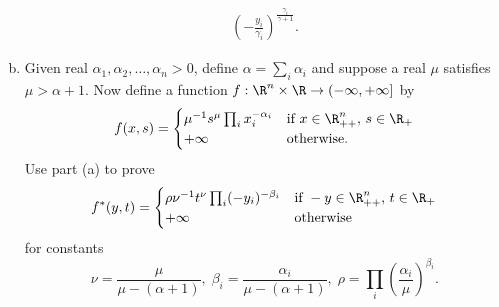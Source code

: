 \documentclass[../borwein-lewis_notes.tex]{subfiles}
\begin{document}
\begin{enumerate}[(a)]
{\begin{align*}
\left(-\frac{y_i}{\gamma_i}\right)^{\frac{\gamma_i}{\gamma+1}}.
\end{align*}
}
\item Given real $\alpha_1,\alpha_2,\ldots,\alpha_n > 0$, define $\alpha
= \sum_i\alpha_i$ and suppose a real $\mu$ satisfies $\mu>\alpha+1$. Now 
define a function $f:\R^n\times\R\to(-\infty,+\infty]$ by 
\begin{equation*}
f(x,s)=\begin{cases} \mu^{-1}s^{\mu}\prod_i x_i^{-\alpha_i}
&\text{if }x\in\R_{++}^n,\, s\in\R_+ \\
+\infty &\text{otherwise.}\end{cases}
\end{equation*}
Use part (a) to prove 
\begin{equation*}
f^*(y,t) = \begin{cases} \rho\nu^{-1} t^{\nu}\prod_i(-y_i)^{-\beta_i}
&\text{if }-y\in\R_{++}^n,\,t\in\R_+ \\
+\infty &\text{otherwise}\end{cases}
\end{equation*}
for constants 
\begin{equation*}
\nu = \frac{\mu}{\mu-(\alpha+1)},\;\beta_i=\frac{\alpha_i}{\mu-(\alpha+1)},
\; \rho=\prod_i\left(\frac{\alpha_i}{\mu}\right)^{\beta_i}.
\end{equation*}
\end{enumerate}
\end{document}
